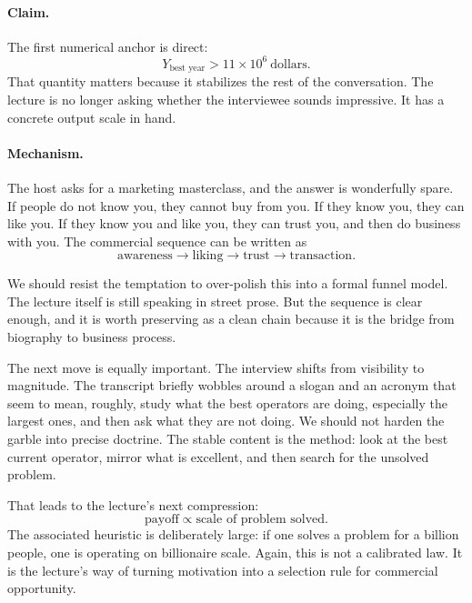 \paragraph{Claim.}
The first numerical anchor is direct:
\begin{equation}
Y_{\text{best year}} > 11\times 10^{6}\ \text{dollars}.
\end{equation}
That quantity matters because it stabilizes the rest of the conversation. The lecture is no longer asking whether the interviewee sounds impressive. It has a concrete output scale in hand.

\paragraph{Mechanism.}
The host asks for a marketing masterclass, and the answer is wonderfully spare. If people do not know you, they cannot buy from you. If they know you, they can like you. If they know you and like you, they can trust you, and then do business with you. The commercial sequence can be written as
\begin{equation}
\text{awareness} \to \text{liking} \to \text{trust} \to \text{transaction}.
\end{equation}

We should resist the temptation to over-polish this into a formal funnel model. The lecture itself is still speaking in street prose. But the sequence is clear enough, and it is worth preserving as a clean chain because it is the bridge from biography to business process.

The next move is equally important. The interview shifts from visibility to magnitude. The transcript briefly wobbles around a slogan and an acronym that seem to mean, roughly, study what the best operators are doing, especially the largest ones, and then ask what they are not doing. We should not harden the garble into precise doctrine. The stable content is the method: look at the best current operator, mirror what is excellent, and then search for the unsolved problem.

That leads to the lecture's next compression:
\begin{equation}
\text{payoff} \propto \text{scale of problem solved}.
\end{equation}
The associated heuristic is deliberately large: if one solves a problem for a billion people, one is operating on billionaire scale. Again, this is not a calibrated law. It is the lecture's way of turning motivation into a selection rule for commercial opportunity.

